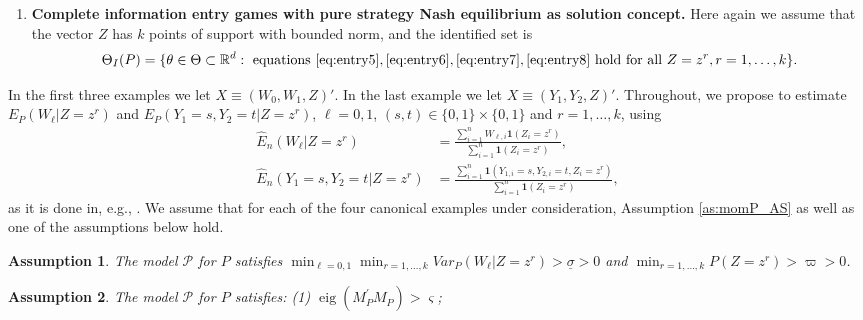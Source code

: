 \documentclass[letterpaper,11pt]{article}
\theoremstyle{myplain}
\theoremstyle{mydefinition}
\newtheorem{assumption}{Assumption}[section]
\theoremstyle{myremark}
\renewcommand{\cite}{\citet}
\newcommand{\eig}{\operatorname{eig}}
\newcommand{\R}{\mathbb{R}}
\newcommand{\cP}{\mathcal{P}}
\numberwithin{equation}{section}
\numberwithin{figure}{section}
\begin{document}
\begin{appendices}
\begin{enumerate}
$E_P(\tilde{W}|Z=z^r)$ equal to $E_P(W_1|Z=z^r)$ and $E_P(W_0|Z=z^r)$, respectively. Hence, the identified set can be written in terms of moment inequalities as
\begin{align}
\Theta_I(P)=\{\theta \in \Theta \subset \R^d: &~q^r [E_P(Z(Z^\prime\theta -W_0-\mathbf{1}(q^rZ>0)(W_1-W_0)))]\le 0 \notag\\
-&~q^r [E_P(Z(Z^\prime\theta -W_0-\mathbf{1}(q^rZ<0)(W_1-W_0)))]\le0,
 r=1,\dots,k\}.\label{eq:Theta_I:BLP}
\end{align}

The set is expressed through evaluation of its support function, given in \cite[Proposition 2]{BontempsMagnacMaurin2012E}, at directions $\pm u^r$; these are the directions orthogonal to the flat faces of $\Theta_I(P)$.
\item \textbf{Complete information entry games with pure strategy Nash equilibrium as solution concept.} Here again we assume that the vector $Z$ has $k$ points of support with bounded norm, and the identified set is
\begin{align}
\Theta_I(P)=\{\theta \in \Theta \subset \R^d:\text{ equations } \eqref{eq:entry5}, \eqref{eq:entry6}, \eqref{eq:entry7}, \eqref{eq:entry8} \text{ hold for all } Z=z^r,r=1,\dots,k\}.
\end{align}
\end{enumerate}
In the first three examples we let $X\equiv(W_0,W_1,Z)'$. In the last example we let $X\equiv(Y_1,Y_2,Z)'$. Throughout, we propose to estimate $E_P(W_\ell|Z=z^r)$ and $E_P(Y_1=s,Y_2=t|Z=z^r)$, $\ell=0,1$, $(s,t)\in \{0,1\}\times\{0,1\}$ and $r=1,\dots,k$, using
\begin{align}
\hat{E}_n(W_\ell|Z=z^r)&=\frac{\sum_{i=1}^n W_{\ell,i}\mathbf{1}(Z_i=z^r)}{\sum_{i=1}^n \mathbf{1}(Z_i=z^r)},\label{eq:kernel_reg1}\\
\hat{E}_n(Y_1=s,Y_2=t|Z=z^r)&=\frac{\sum_{i=1}^n \mathbf{1}(Y_{1,i}=s,Y_{2,i}=t,Z_i=z^r)}{\sum_{i=1}^n \mathbf{1}(Z_i=z^r)},\label{eq:kernel_reg}
\end{align}
as it is done in, e.g., \cite{CilibertoTamer09}.
We assume that for each of the four canonical examples under consideration, Assumption \ref{as:momP_AS} as well as one of the assumptions below hold. 
\begin{assumption}
\label{as:var:BM} 
The model $\cP$ for $P$ satisfies $\min_{\ell=0,1}\min_{r=1,\dots,k}Var_P(W_\ell|Z=z^r)>\underline{\sigma}>0$ and \newline $\min_{r=1,\dots,k}P(Z=z^r)>\varpi>0$.
\end{assumption}
\begin{assumption}
\label{as:overlap} 
The model $\cP$ for $P$ satisfies: (1) $\eig(M_P^\prime M_P)>\varsigma$;


\end{assumption}
\end{appendices}
\end{document}
